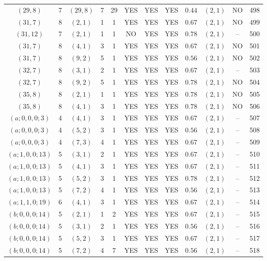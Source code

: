 \begin{longtable}{|c|c|c|c|c|c|c|c|c|c|c|c|}
$(29,8)$ & 7 & $(29,8)$ & 7 & 29 & YES & YES & YES & $0.44$ & $(2,1)$ & NO & 498\\
$(31,7)$ & 8 & $(2,1)$ & 1 & 1 & YES & YES & YES & $0.67$ & $(2,1)$ & NO & 499\\
$(31,12)$ & 7 & $(2,1)$ & 1 & 1 & NO & YES & YES & $0.78$ & $(2,1)$ & -- & 500\\
$(31,7)$ & 8 & $(4,1)$ & 3 & 1 & YES & YES & YES & $0.67$ & $(2,1)$ & NO & 501\\
$(31,7)$ & 8 & $(9,2)$ & 5 & 1 & YES & YES & YES & $0.56$ & $(2,1)$ & NO & 502\\
$(32,7)$ & 8 & $(3,1)$ & 2 & 1 & YES & YES & YES & $0.67$ & $(2,1)$ & -- & 503\\
$(32,7)$ & 8 & $(9,2)$ & 5 & 1 & YES & YES & YES & $0.78$ & $(2,1)$ & NO & 504\\
$(35,8)$ & 8 & $(2,1)$ & 1 & 1 & YES & YES & YES & $0.78$ & $(2,1)$ & NO & 505\\
$(35,8)$ & 8 & $(4,1)$ & 3 & 1 & YES & YES & YES & $0.78$ & $(2,1)$ & NO & 506\\
$(a;0,0,0;3)$ & 4 & $(4,1)$ & 3 & 1 & YES & YES & YES & $0.67$ & $(2,1)$ & -- & 507\\
$(a;0,0,0;3)$ & 4 & $(5,2)$ & 3 & 1 & YES & YES & YES & $0.56$ & $(2,1)$ & -- & 508\\
$(a;0,0,0;3)$ & 4 & $(7,3)$ & 4 & 1 & YES & YES & YES & $0.67$ & $(2,1)$ & -- & 509\\
$(a;1,0,0;13)$ & 5 & $(3,1)$ & 2 & 1 & YES & YES & YES & $0.67$ & $(2,1)$ & -- & 510\\
$(a;1,0,0;13)$ & 5 & $(4,1)$ & 3 & 1 & YES & YES & YES & $0.67$ & $(2,1)$ & -- & 511\\
$(a;1,0,0;13)$ & 5 & $(5,2)$ & 3 & 1 & YES & YES & YES & $0.78$ & $(2,1)$ & -- & 512\\
$(a;1,0,0;13)$ & 5 & $(7,2)$ & 4 & 1 & YES & YES & YES & $0.56$ & $(2,1)$ & -- & 513\\
$(a;1,1,0;19)$ & 6 & $(4,1)$ & 3 & 1 & YES & YES & YES & $0.67$ & $(2,1)$ & -- & 514\\
$(b;0,0,0;14)$ & 5 & $(2,1)$ & 1 & 2 & YES & YES & YES & $0.67$ & $(2,1)$ & -- & 515\\
$(b;0,0,0;14)$ & 5 & $(3,1)$ & 2 & 1 & YES & YES & YES & $0.56$ & $(2,1)$ & -- & 516\\
$(b;0,0,0;14)$ & 5 & $(5,2)$ & 3 & 1 & YES & YES & YES & $0.67$ & $(2,1)$ & -- & 517\\
$(b;0,0,0;14)$ & 5 & $(7,2)$ & 4 & 7 & YES & YES & YES & $0.56$ & $(2,1)$ & -- & 518\\

\end{longtable}

